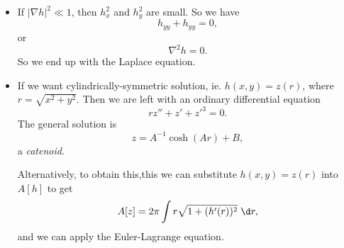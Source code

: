 \documentclass[a4paper]{article}
\begin{document}
\begin{eg}
\begin{itemize}
    \item If $|\nabla h|^2 \ll 1$, then $h_x^2$ and $h_y^2$ are small. So we have 
      \[
        h_{yy} + h_{yy} = 0,
      \]
      or
      \[
        \nabla^2 h = 0.
      \]
      So we end up with the Laplace equation.
    \item If we want cylindrically-symmetric solution, ie. $h(x, y) = z(r)$, where $r = \sqrt{x^2 + y^2}$. Then we are left with an ordinary differential equation
      \[
        rz'' + z' + z'^3 = 0.
      \]
      The general solution is
      \[
        z = A^{-1}\cosh (Ar) + B,
      \]
      a \emph{catenoid}.

      Alternatively, to obtain this,this we can substitute $h(x, y) = z(r)$ into $A[h]$ to get
      \[
        A[z] = 2\pi \int r\sqrt{1 + (h'(r))^2}\;\d r,
      \]
      and we can apply the Euler-Lagrange equation.
  \end{itemize}
\end{eg}
\end{document}
